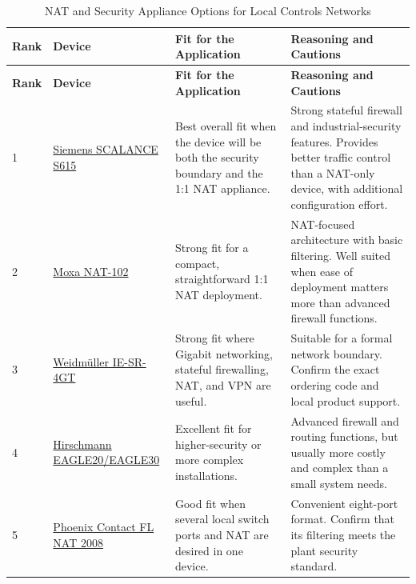 \begin{landscape}
\begin{footnotesize}
\setlength{\tabcolsep}{4pt}
\begin{longtable}{@{}p{0.8cm}p{4.1cm}p{5.5cm}p{5.5cm}@{}}
\caption{NAT and Security Appliance Options for Local Controls Networks}\label{tab:nat-options} \\
\toprule
\rowcolor{tblhead}\textbf{Rank} & \textbf{Device} & \textbf{Fit for the Application} & \textbf{Reasoning and Cautions} \\
\midrule
\endfirsthead
\toprule
\rowcolor{tblhead}\textbf{Rank} & \textbf{Device} & \textbf{Fit for the Application} & \textbf{Reasoning and Cautions} \\
\midrule
\endhead
1 & \href{https://www.siemens.com/global/en/products/automation/industrial-communication/industrial-security/scalance-s.html}{Siemens SCALANCE S615} & Best overall fit when the device will be both the security boundary and the 1:1 NAT appliance. & Strong stateful firewall and industrial-security features. Provides better traffic control than a NAT-only device, with additional configuration effort. \\
2 & \href{https://www.moxa.com/en/products/industrial-network-infrastructure/secure-routers/secure-nat-gateways/nat-102-series}{Moxa NAT-102} & Strong fit for a compact, straightforward 1:1 NAT deployment. & NAT-focused architecture with basic filtering. Well suited when ease of deployment matters more than advanced firewall functions. \\
3 & \href{https://www.weidmueller.com/en/products/automation_software/industrial_ethernet/security_router/index.jsp}{Weidm\"uller IE-SR-4GT} & Strong fit where Gigabit networking, stateful firewalling, NAT, and VPN are useful. & Suitable for a formal network boundary. Confirm the exact ordering code and local product support. \\
4 & \href{https://www.belden.com/products/networking-cybersecurity/industrial-cybersecurity/industrial-firewalls/eagle}{Hirschmann EAGLE20/EAGLE30} & Excellent fit for higher-security or more complex installations. & Advanced firewall and routing functions, but usually more costly and complex than a small system needs. \\
5 & \href{https://www.phoenixcontact.com/en-us/products/nat-switch-fl-nat-2008-2702881}{Phoenix Contact FL NAT 2008} & Good fit when several local switch ports and NAT are desired in one device. & Convenient eight-port format. Confirm that its filtering meets the plant security standard. \\

\end{longtable}
\end{footnotesize}
\end{landscape}
